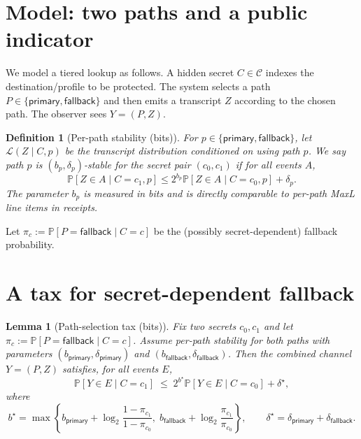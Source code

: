 \documentclass[11pt]{article}
\newtheorem{definition}{Definition}
\newtheorem{lemma}{Lemma}
\newcommand{\Pp}{\mathbb{P}}
\newcommand{\logtwo}{\log_2}
\begin{document}
\section{Model: two paths and a public indicator}

We model a tiered lookup as follows.
A hidden secret $C\in\mathcal{C}$ indexes the destination/profile to be protected.
The system selects a path $P\in\{\textsf{primary},\textsf{fallback}\}$ and then emits a transcript $Z$ according to the chosen path.
The observer sees $Y=(P,Z)$.

\begin{definition}[Per-path stability (bits)]
For $p\in\{\textsf{primary},\textsf{fallback}\}$, let $\mathcal{L}(Z\mid C,p)$ be the transcript distribution conditioned on using path $p$.
We say path $p$ is $(b_p,\delta_p)$-\emph{stable} for the secret pair $(c_0,c_1)$ if for all events $A$,
\[
\Pp[Z\in A \mid C=c_1,p] \le 2^{b_p}\Pp[Z\in A \mid C=c_0,p] + \delta_p.
\]
The parameter $b_p$ is measured in \emph{bits} and is directly comparable to per-path MaxL line items in receipts.
\end{definition}

Let $\pi_c := \Pp[P=\textsf{fallback}\mid C=c]$ be the (possibly secret-dependent) fallback probability.

\section{A tax for secret-dependent fallback}

\begin{lemma}[Path-selection tax (bits)]\label{lem:path-tax}
Fix two secrets $c_0,c_1$ and let $\pi_c := \Pp[P=\textsf{fallback}\mid C=c]$.
Assume per-path stability for both paths with parameters $(b_{\textsf{primary}},\delta_{\textsf{primary}})$ and $(b_{\textsf{fallback}},\delta_{\textsf{fallback}})$.
Then the combined channel $Y=(P,Z)$ satisfies, for all events $E$,
\[
\Pp[Y\in E \mid C=c_1]
\;\le\;
2^{b^\star}\Pp[Y\in E \mid C=c_0] + \delta^\star,
\]
where
\[
b^\star
=
\max\!\left\{
b_{\textsf{primary}} + \logtwo\!\frac{1-\pi_{c_1}}{1-\pi_{c_0}},
\;
b_{\textsf{fallback}} + \logtwo\!\frac{\pi_{c_1}}{\pi_{c_0}}
\right\},
\qquad
\delta^\star = \delta_{\textsf{primary}}+\delta_{\textsf{fallback}}.
\]
\end{lemma}
\end{document}
